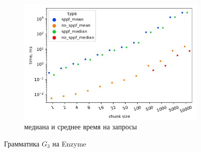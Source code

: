 \documentclass[14pt]{matmex-diploma-custom}
\theoremstyle{definition}
\begin{document}
\begin{figure}[H]
\begin{subfigure}[b]{0.5\textwidth}
    \includegraphics[width=\textwidth]{pics/bt_sppf_mean&median.pdf_1.jpg}  \caption{медиана и среднее время на запросы}
    \label{fig:subim0}
    \end{subfigure} \caption{Грамматика $G_3$ на Enzyme}
\label{sss}
\end{figure}
\end{document}
